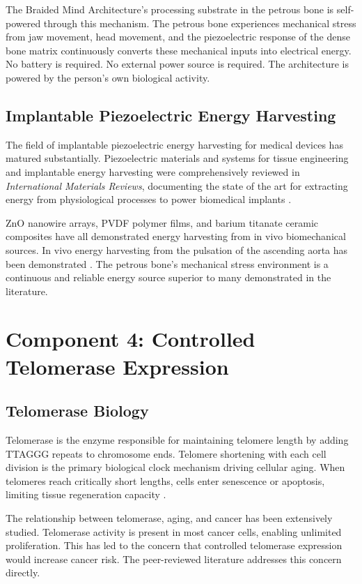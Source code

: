 \documentclass[12pt]{article}
\begin{document}
The Braided Mind Architecture's processing substrate in the petrous bone is self-powered through this mechanism. The petrous bone experiences mechanical stress from jaw movement, head movement, and the piezoelectric response of the dense bone matrix continuously converts these mechanical inputs into electrical energy. No battery is required. No external power source is required. The architecture is powered by the person's own biological activity.

\subsection{Implantable Piezoelectric Energy Harvesting}

The field of implantable piezoelectric energy harvesting for medical devices has matured substantially. Piezoelectric materials and systems for tissue engineering and implantable energy harvesting were comprehensively reviewed in \textit{International Materials Reviews}, documenting the state of the art for extracting energy from physiological processes to power biomedical implants \cite{piezo_tissue_engineering_2022}.

ZnO nanowire arrays, PVDF polymer films, and barium titanate ceramic composites have all demonstrated energy harvesting from in vivo biomechanical sources. In vivo energy harvesting from the pulsation of the ascending aorta has been demonstrated \cite{piezo_implant_review_2024}. The petrous bone's mechanical stress environment is a continuous and reliable energy source superior to many demonstrated in the literature.

\section{Component 4: Controlled Telomerase Expression}

\subsection{Telomerase Biology}

Telomerase is the enzyme responsible for maintaining telomere length by adding TTAGGG repeats to chromosome ends. Telomere shortening with each cell division is the primary biological clock mechanism driving cellular aging. When telomeres reach critically short lengths, cells enter senescence or apoptosis, limiting tissue regeneration capacity \cite{telomerase_aging_cancer_pmc}.

The relationship between telomerase, aging, and cancer has been extensively studied. Telomerase activity is present in most cancer cells, enabling unlimited proliferation. This has led to the concern that controlled telomerase expression would increase cancer risk. The peer-reviewed literature addresses this concern directly.
\end{document}
